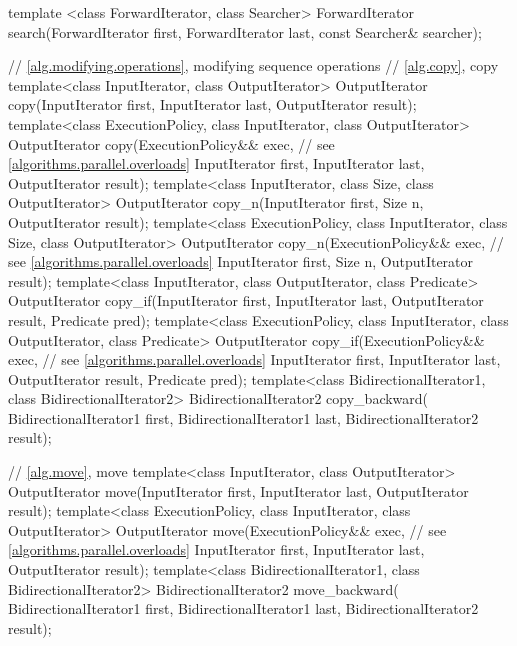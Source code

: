 \begin{codeblock}
{  template <class ForwardIterator, class Searcher>
    ForwardIterator search(ForwardIterator first, ForwardIterator last,
                           const Searcher& searcher);

  // \ref{alg.modifying.operations}, modifying sequence operations
  // \ref{alg.copy}, copy
  template<class InputIterator, class OutputIterator>
    OutputIterator copy(InputIterator first, InputIterator last,
                        OutputIterator result);
  template<class ExecutionPolicy, class InputIterator, class OutputIterator>
    OutputIterator copy(ExecutionPolicy&& exec, // see \ref{algorithms.parallel.overloads}
                        InputIterator first, InputIterator last,
                        OutputIterator result);
  template<class InputIterator, class Size, class OutputIterator>
    OutputIterator copy_n(InputIterator first, Size n,
                          OutputIterator result);
  template<class ExecutionPolicy, class InputIterator, class Size,
           class OutputIterator>
    OutputIterator copy_n(ExecutionPolicy&& exec, // see \ref{algorithms.parallel.overloads}
                          InputIterator first, Size n,
                          OutputIterator result);
  template<class InputIterator, class OutputIterator, class Predicate>
    OutputIterator copy_if(InputIterator first, InputIterator last,
                           OutputIterator result, Predicate pred);
  template<class ExecutionPolicy, class InputIterator, class OutputIterator,
           class Predicate>
    OutputIterator copy_if(ExecutionPolicy&& exec, // see \ref{algorithms.parallel.overloads}
                           InputIterator first, InputIterator last,
                           OutputIterator result, Predicate pred);
  template<class BidirectionalIterator1, class BidirectionalIterator2>
    BidirectionalIterator2 copy_backward(
      BidirectionalIterator1 first, BidirectionalIterator1 last,
      BidirectionalIterator2 result);

  // \ref{alg.move}, move
  template<class InputIterator, class OutputIterator>
    OutputIterator move(InputIterator first, InputIterator last,
                        OutputIterator result);
  template<class ExecutionPolicy, class InputIterator,
           class OutputIterator>
    OutputIterator move(ExecutionPolicy&& exec, // see \ref{algorithms.parallel.overloads}
                        InputIterator first, InputIterator last,
                        OutputIterator result);
  template<class BidirectionalIterator1, class BidirectionalIterator2>
    BidirectionalIterator2 move_backward(
      BidirectionalIterator1 first, BidirectionalIterator1 last,
      BidirectionalIterator2 result);

}
\end{codeblock}
